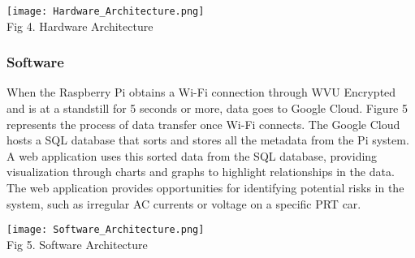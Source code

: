 \begin{center}
    \texttt{[image: Hardware\_Architecture.png]}\\
    Fig 4. Hardware Architecture
\end{center}

\subsubsection{Software}
When the Raspberry Pi obtains a Wi-Fi connection through WVU Encrypted and is at a standstill for 5 seconds or more, data goes to Google Cloud. 
Figure 5 represents the process of data transfer once Wi-Fi connects. 
The Google Cloud hosts a SQL database that sorts and stores all the metadata from the Pi system. 
A web application uses this sorted data from the SQL database, providing visualization through charts and graphs to highlight relationships in the data. 
The web application provides opportunities for identifying potential risks in the system, such as irregular AC currents or voltage on a specific PRT car.

\begin{center}
    \texttt{[image: Software\_Architecture.png]}\\
    Fig 5. Software Architecture
\end{center}